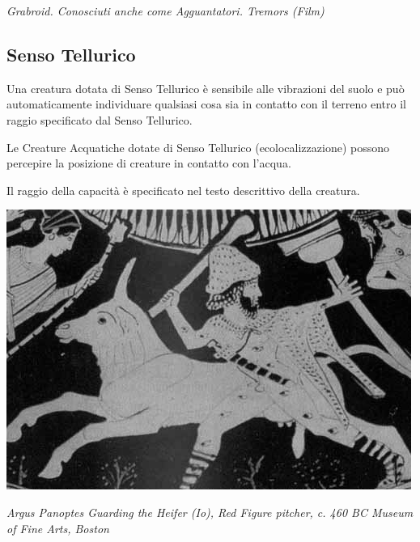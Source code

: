 \begin{multicols}{2}
\begin{center}
\medskip

\emph{Grabroid. Conosciuti anche come Agguantatori. Tremors (Film)}
\end{center}

\subsection{Senso Tellurico}\label{sensotellurico}
Una creatura dotata di Senso Tellurico è sensibile alle vibrazioni del suolo e può automaticamente individuare qualsiasi cosa sia in contatto con il terreno entro il raggio specificato dal Senso Tellurico.

Le Creature Acquatiche dotate di Senso Tellurico (ecolocalizzazione) possono percepire la posizione di creature in contatto con l'acqua.

Il raggio della capacità è specificato nel testo descrittivo della creatura.

\end{multicols}

\vfill

\begin{center}
	\includegraphics[width=0.75\linewidth]{immagini/argus2.png}

	\emph{Argus Panoptes Guarding the Heifer (Io), Red Figure pitcher, c. 460 BC Museum of Fine Arts, Boston}
\end{center}

\pagebreak

